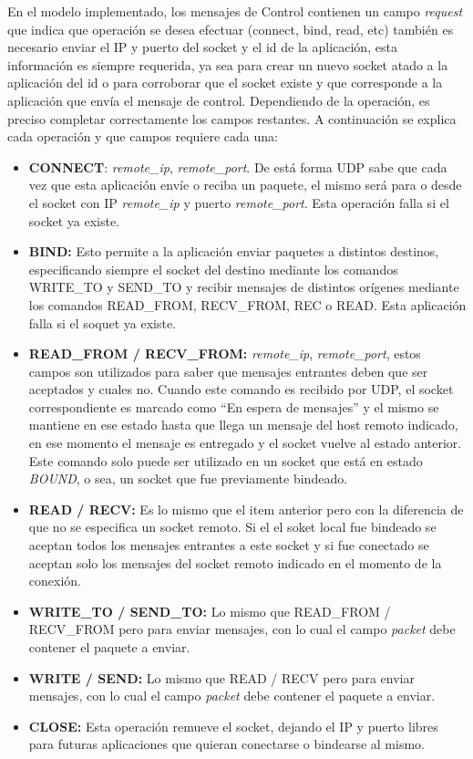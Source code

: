 \documentclass[10pt,a4paper]{article}
\begin{document}
\newpage
 
En el modelo implementado, los mensajes de Control contienen un campo \textit{request} que indica que operación se desea efectuar (connect, bind, read, etc) también es necesario enviar el IP y puerto del socket y el id de la aplicación, esta información es siempre requerida, ya sea para crear un nuevo socket atado a la aplicación del id o para corroborar que el socket existe y que corresponde a la aplicación que envía el mensaje de control. Dependiendo de la operación, es preciso completar correctamente los campos restantes. A continuación se explica cada operación y que campos requiere cada una: \\

\begin{itemize}
\item \textbf{CONNECT}: \textit{remote\_ip}, \textit{remote\_port}. De está forma UDP sabe que cada vez que esta aplicación envíe o reciba un paquete, el mismo será para o desde el socket con IP \textit{remote\_ip} y puerto \textit{remote\_port}. Esta operación falla si el socket ya existe.
\item \textbf{BIND:} Esto permite a la aplicación enviar paquetes a distintos destinos, especificando siempre el socket del destino mediante los comandos WRITE\_TO y SEND\_TO y recibir mensajes de distintos orígenes mediante los comandos READ\_FROM, RECV\_FROM, REC o READ. Esta aplicación falla si el soquet ya existe.
\item \textbf{READ\_FROM / RECV\_FROM:} \textit{remote\_ip}, \textit{remote\_port}, estos campos son utilizados para saber que mensajes entrantes deben que ser aceptados y cuales no. Cuando este comando es recibido por UDP, el socket correspondiente es marcado como ``En espera de mensajes'' y el mismo se mantiene en ese estado hasta que llega un mensaje del host remoto indicado, en ese momento el mensaje es entregado y el socket vuelve al estado anterior. Este comando solo puede ser utilizado en un socket que está en estado \textit{BOUND}, o sea, un socket que fue previamente bindeado.
\item \textbf{READ / RECV:} Es lo mismo que el item anterior pero con la diferencia de que no se especifica un socket remoto. Si el el soket local fue bindeado se aceptan todos los mensajes entrantes a este socket y si fue conectado se aceptan solo los mensajes del socket remoto indicado en el momento de la conexión.
\item \textbf{WRITE\_TO / SEND\_TO:} Lo mismo que READ\_FROM / RECV\_FROM pero para enviar mensajes, con lo cual el campo \textit{packet} debe contener el paquete a enviar.
\item \textbf{WRITE / SEND:} Lo mismo que READ / RECV pero para enviar mensajes, con lo cual el campo \textit{packet} debe contener el paquete a enviar.
\item \textbf{CLOSE:} Esta operación remueve el socket, dejando el IP y puerto libres para futuras aplicaciones que quieran conectarse o bindearse al mismo.
\end{itemize}
\end{document}
